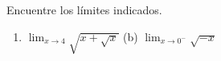 \setcounter{enumi}{10}
\item Encuentre los límites indicados.
\begin{enumerate}
    \item[(a)] $\displaystyle \lim_{x \to 4} \sqrt{x + \sqrt{x}}$ \quad (b) $\displaystyle \lim_{x \to 0^-} \sqrt{-x}$
\end{enumerate}
